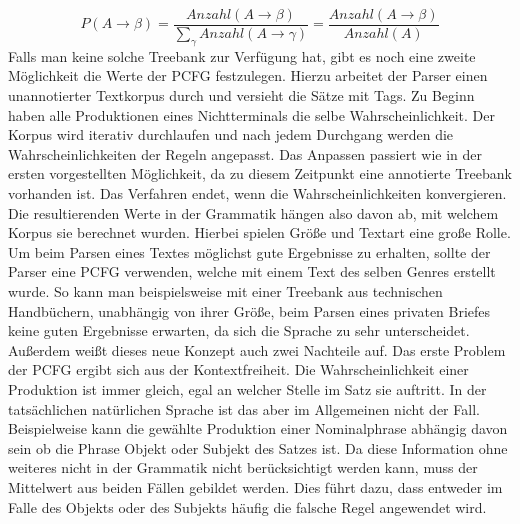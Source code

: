 \begin{equation}
P(A \to \beta) = \frac{Anzahl(A \to \beta)}{ \sum_{\gamma} Anzahl(A \to \gamma)} = \frac{Anzahl(A \to \beta)}{Anzahl(A)}
\end{equation}
Falls man keine solche Treebank zur Verfügung hat, gibt es noch eine zweite Möglichkeit die Werte der PCFG festzulegen. Hierzu arbeitet der Parser einen unannotierter Textkorpus durch und versieht die Sätze mit Tags. Zu Beginn haben alle Produktionen eines Nichtterminals die selbe Wahrscheinlichkeit. Der Korpus wird iterativ durchlaufen und nach jedem Durchgang werden die Wahrscheinlichkeiten der Regeln angepasst. Das Anpassen passiert wie in der ersten vorgestellten Möglichkeit, da zu diesem Zeitpunkt eine annotierte Treebank vorhanden ist. Das Verfahren endet, wenn die Wahrscheinlichkeiten konvergieren. \\
Die resultierenden Werte in der Grammatik hängen also davon ab, mit welchem Korpus sie berechnet wurden. Hierbei spielen Größe und Textart eine große Rolle. Um beim Parsen eines Textes möglichst gute Ergebnisse zu erhalten, sollte der Parser eine PCFG verwenden, welche mit einem Text des selben Genres erstellt wurde. So kann man beispielsweise mit einer Treebank aus technischen Handbüchern, unabhängig von ihrer Größe, beim Parsen eines privaten Briefes keine guten Ergebnisse erwarten, da sich die Sprache zu sehr unterscheidet.\\ %
Außerdem weißt dieses neue Konzept auch zwei Nachteile auf.
Das erste Problem der PCFG ergibt sich aus der Kontextfreiheit. Die Wahrscheinlichkeit einer Produktion ist immer gleich, egal an welcher Stelle im Satz sie auftritt. In der tatsächlichen natürlichen Sprache ist das aber im Allgemeinen nicht der Fall. Beispielweise kann die gewählte Produktion einer Nominalphrase abhängig davon sein ob die Phrase Objekt oder Subjekt des Satzes ist. Da diese Information ohne weiteres nicht in der Grammatik nicht berücksichtigt werden kann, muss der Mittelwert aus beiden Fällen gebildet werden. Dies führt dazu, dass entweder im Falle des Objekts oder des Subjekts häufig die falsche Regel angewendet wird. \\
